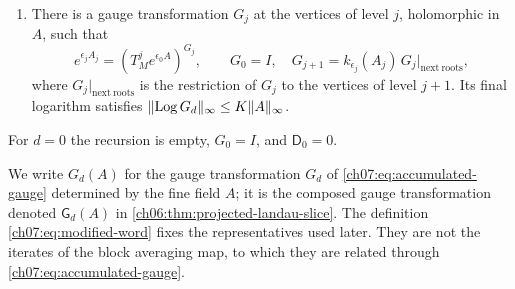 \begin{lemma}
\begin{enumerate}
\begin{equation}
 \begin{aligned}
 \norm{D^s\mathsf D_d}_{b,\mathrm{out}}&\le K^ss!,&
 \norm{D^s\mathsf D_d}_{b,\mathrm{input,count}}&\le\epsilon_0^3K^ss!\quad(s\ge2),\\
 \norm{D\mathsf D_d(w)}_{b,\mathrm{out}}&\le K\norm w_\infty,&
 \norm{D\mathsf D_d(w)}_{b,\mathrm{input,count}}&\le\epsilon_0^3K\norm w_\infty .
 \end{aligned}
\end{equation}
\item There is a gauge transformation $G_j$ at the vertices of level $j$, holomorphic in $A$, such that
\begin{equation}\label{ch07:eq:accumulated-gauge}
 e^{\epsilon_jA_j}=(T_M^je^{\epsilon_0A})^{G_j},\qquad
 G_0=I,\quad G_{j+1}=k_{\epsilon_j}(A_j)\,G_j|_{\mathrm{next\ roots}},
\end{equation}
where $G_j|_{\mathrm{next\ roots}}$ is the restriction of $G_j$ to the vertices of level $j+1$. Its final logarithm satisfies $\lVert \operatorname{Log} G_d\rVert_\infty\le K\lVert A\rVert_\infty$.
\end{enumerate}
For $d=0$ the recursion is empty, $G_0=I$, and $\mathsf D_0=0$.
\end{lemma}

We write $G_d(A)$ for the gauge transformation $G_d$ of \eqref{ch07:eq:accumulated-gauge} determined by the fine field $A$; it is the composed gauge transformation denoted $\mathsf G_d(A)$ in \cref{ch06:thm:projected-landau-slice}. The definition \eqref{ch07:eq:modified-word} fixes the representatives used later. They are not the iterates of the block averaging map, to which they are related through \eqref{ch07:eq:accumulated-gauge}.

